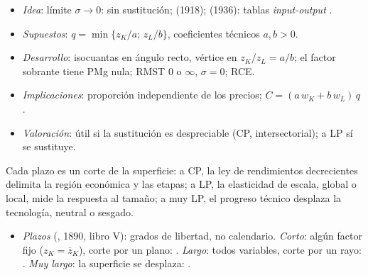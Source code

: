 \documentclass{article}
\begin{document}
\begin{columnas}
\begin{itemize}
\item \emph{Idea}: límite $\sigma\to0$: sin sustitución;  (1918);  (1936): tablas \emph{input-output} .
\item \emph{Supuestos}: $q=\min\{z_K/a;\,z_L/b\}$, coeficientes técnicos $a,b>0$.
\item \emph{Desarrollo}: isocuantas en ángulo recto, vértice en $z_K/z_L=a/b$; el factor sobrante tiene PMg nula; RMST $0$ o $\infty$, $\sigma=0$; RCE.
\item \emph{Implicaciones}: proporción independiente de los precios; $C=(a\,w_K+b\,w_L)\,q$ .
\item \emph{Valoración}: útil si la sustitución es despreciable (CP, intersectorial); a LP sí se sustituye.
\end{itemize}

\begin{ideaclave}
Cada plazo es un corte de la superficie: a CP, la ley de rendimientos decrecientes delimita la región económica y las etapas; a LP, la elasticidad de escala, global o local, mide la respuesta al tamaño; a muy LP, el progreso técnico desplaza la tecnología, neutral o sesgado.
\end{ideaclave}
\begin{itemize}
\item \emph{Plazos} (, 1890, libro V): grados de libertad, no calendario. \emph{Corto}: algún factor fijo ($z_K=\overline{z}_K$), corte por un plano: . \emph{Largo}: todos variables, corte por un rayo: . \emph{Muy largo}: la superficie se desplaza: .
\end{itemize}


\end{columnas}
\end{document}
